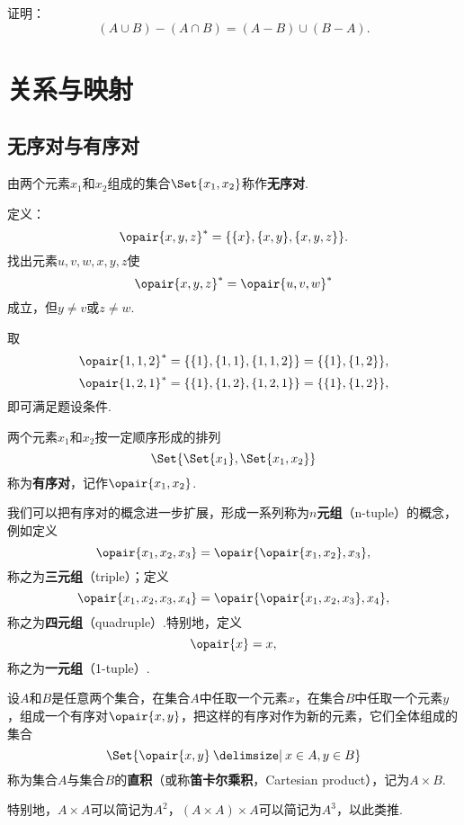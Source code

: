 \begin{example}
证明：\[
(A \cup B) - (A \cap B) = (A-B)\cup(B-A).
\]
\end{example}

\section{关系与映射}
\subsection{无序对与有序对}
\begin{definition}[无序对]
由两个元素\(x_1\)和\(x_2\)组成的集合\(\Set{x_1, x_2}\)称作\textbf{无序对}.
\end{definition}

\begin{example}
定义：\[
\opair{x,y,z}^* = \{\{x\},\{x,y\},\{x,y,z\}\}.
\]找出元素\(u,v,w,x,y,z\)使\[
\opair{x,y,z}^* = \opair{u,v,w}^*
\]成立，但\(y \neq v\)或\(z \neq w\).
\begin{solution}
取\[
\opair{1,1,2}^* = \{\{1\},\{1,1\},\{1,1,2\}\} = \{\{1\},\{1,2\}\},
\]\[
\opair{1,2,1}^* = \{\{1\},\{1,2\},\{1,2,1\}\} = \{\{1\},\{1,2\}\},
\]即可满足题设条件.
\end{solution}
\end{example}

\begin{definition}[有序对]
两个元素\(x_1\)和\(x_2\)按一定顺序形成的排列\[
\Set{ \Set{x_1}, \Set{x_1, x_2} }
\]称为\textbf{有序对}，记作\(\opair{x_1,x_2}\).

我们可以把有序对的概念进一步扩展，形成一系列称为\(n\)\textbf{元组}（n-tuple）的概念，例如定义\[
\opair{x_1,x_2,x_3} = \opair{\opair{x_1,x_2},x_3},
\]称之为\textbf{三元组}（triple）；定义\[
\opair{x_1,x_2,x_3,x_4} = \opair{\opair{x_1,x_2,x_3},x_4},
\]称之为\textbf{四元组}（quadruple）.特别地，定义\[
\opair{x} = x,
\]称之为\textbf{一元组}（1-tuple）.
\end{definition}

\begin{definition}[直积、笛卡尔乘积]
设\(A\)和\(B\)是任意两个集合，在集合\(A\)中任取一个元素\(x\)，在集合\(B\)中任取一个元素\(y\)，组成一个有序对\(\opair{x,y}\)，把这样的有序对作为新的元素，它们全体组成的集合\[
\Set{ \opair{x,y} \given x \in A, y \in B }
\]称为集合\(A\)与集合\(B\)的\textbf{直积}（或称\textbf{笛卡尔乘积}，Cartesian product），记为\(A \times B\).

特别地，\(A \times A\)可以简记为\(A^2\)，\((A \times A) \times A\)可以简记为\(A^3\)，以此类推.
\end{definition}

